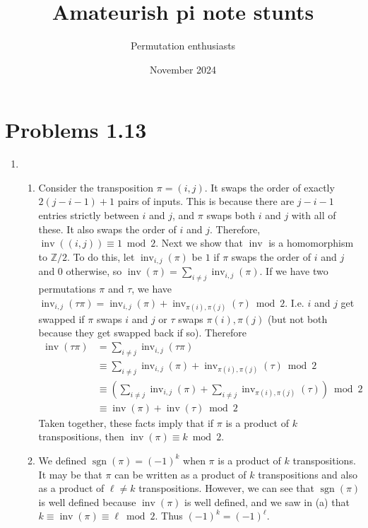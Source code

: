 \documentclass{amsart}
\title{Amateurish pi note stunts}
\author{Permutation enthusiasts}
\date{November 2024}
\DeclareMathOperator{\inv}{inv}
\DeclareMathOperator{\sgn}{sgn}
\newcommand{\ZZ}{\mathbb{Z}}
\begin{document}
\maketitle

\section{Problems 1.13}

\begin{enumerate}
    \item
    \begin{enumerate}
        \item  Consider the transposition $\pi = (i,j)$.  It swaps the order of exactly $2(j-i-1) + 1$ pairs of inputs.  This is because there are $j-i-1$ entries strictly between $i$ and $j$, and $\pi$ swaps both $i$ and $j$ with all of these.  It also swaps the order of $i$ and $j$.  Therefore, $\inv((i,j)) \equiv 1 \bmod 2$.  Next we show that $\inv$ is a homomorphism to $\ZZ/2$.  To do this, let $\inv_{i,j}(\pi)$ be $1$ if $\pi$ swaps the order of $i$ and $j$ and $0$ otherwise, so $\inv(\pi) = \sum_{i \ne j}\inv_{i,j}(\pi)$.  If we have two permutations $\pi$ and $\tau$, we have $\inv_{i,j}(\tau\pi) = \inv_{i,j}(\pi) + \inv_{\pi(i),\pi(j)}(\tau) \bmod 2$. I.e. $i$ and $j$ get swapped if $\pi$ swaps $i$ and $j$ or $\tau$ swaps $\pi(i), \pi(j)$ (but not both because they get swapped back if so).
        Therefore
        \begin{align*}
        \inv(\tau\pi) &= \sum_{i\ne j} \inv_{i,j}(\tau\pi) \\
                      &\equiv \sum_{i\ne j} \inv_{i,j}(\pi) + \inv_{\pi(i),\pi(j)}(\tau) \bmod 2 \\
                      &\equiv \left(\sum_{i \ne j} \inv_{i,j}(\pi) + \sum_{i\ne j}\inv_{\pi(i),\pi(j)}(\tau)\right) \bmod 2  \\
                      &\equiv \inv(\pi) + \inv(\tau) \bmod 2
        \end{align*}
        Taken together, these facts imply that if $\pi$ is a product of $k$ transpositions, then $\inv(\pi) \equiv k \bmod 2$.
        \item We defined $\sgn(\pi) = (-1)^k$ when $\pi$ is a product of $k$ transpositions.  It may be that $\pi$ can be written as a product of $k$ transpositions and also as a product of $\ell\ne k$ transpositions.  However, we can see that $\sgn(\pi)$ is well defined because $\inv(\pi)$ is well defined, and we saw in (a) that $k \equiv \inv(\pi) \equiv \ell \bmod 2$.  Thus $(-1)^k = (-1)^\ell$.

\end{enumerate}
\end{enumerate}
\end{document}
